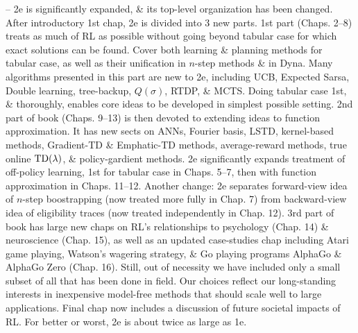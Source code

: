 \documentclass{article}
\begin{document}
\begin{itemize}
    -- 2e is significantly expanded, \& its top-level organization has been changed. After introductory 1st chap, 2e is divided into 3 new parts. 1st part (Chaps. 2--8) treats as much of RL as possible without going beyond tabular case for which exact solutions can be found. Cover both learning \& planning methods for tabular case, as well as their unification in $n$-step methods \& in Dyna. Many algorithms presented in this part are new to 2e, including UCB, Expected Sarsa, Double learning, tree-backup, $Q(\sigma)$, RTDP, \& MCTS. Doing tabular case 1st, \& thoroughly, enables core ideas to be developed in simplest possible setting. 2nd part of book (Chaps. 9--13) is then devoted to extending ideas to function approximation. It has new sects on  ANNs, Fourier basis, LSTD, kernel-based methods, Gradient-TD \& Emphatic-TD methods, average-reward methods, true online ${\rm TD}(\lambda)$, \& policy-gardient methods. 2e significantly expands treatment of off-policy learning, 1st for tabular case in Chaps. 5--7, then with function approximation in Chaps. 11--12. Another change: 2e separates forward-view idea of $n$-step boostrapping (now treated more fully in Chap. 7) from backward-view idea of eligibility traces (now treated independently in Chap. 12). 3rd part of book has large new chaps on RL's relationships to psychology (Chap. 14) \& neuroscience (Chap. 15), as well as an updated case-studies chap including Atari game playing, Watson's wagering strategy, \& Go playing programs AlphaGo \& AlphaGo Zero (Chap. 16). Still, out of necessity we have included only a small subset of all that has been done in field. Our choices reflect our long-standing interests in inexpensive model-free methods that should scale well to large applications. Final chap now includes a discussion of future societal impacts of RL. For better or worst, 2e is about twice as large as 1e.


\end{itemize}
\end{document}
